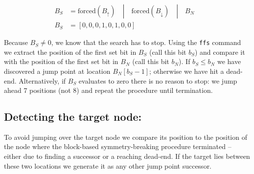 \begin{align}
B_S &= \mathrm{forced}(B_{\uparrow})\quad|\quad \mathrm{forced}(B_{\downarrow})\quad | \quad B_N &\\
B_S &= [0,0,0,1,0,1,0,0] &
\end{align}

Because $B_S \neq 0$, we know that the search has to stop.  Using the
\texttt{ffs} command we extract the position of the first set bit in $B_S$
(call this bit $b_S$) and compare it with the position of the first set bit
in $B_N$ (call this bit $b_N$).  If $b_S \leq b_N$ we have discovered a jump point at
location $B_N[b_S-1]$; otherwise we have hit a dead-end.  Alternatively, if
$B_S$ evaluates to zero there is no reason to stop: we jump ahead 7 positions
(not 8) and repeat the procedure until termination.
\\ \noindent
\subsection*{Detecting the target node:}
To avoid jumping over the target node we compare its position to the position
of the node where the block-based symmetry-breaking procedure terminated --
either due to finding a successor or a reaching dead-end. If the target lies
between these two locations we generate it as any other jump point successor.

